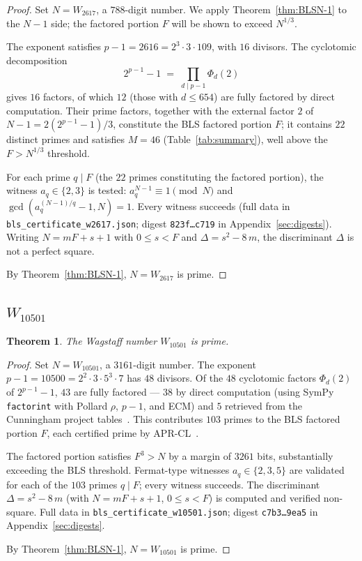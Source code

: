 \documentclass[11pt,a4paper]{amsart}
\theoremstyle{plain}
\newtheorem{theorem}{Theorem}[section]
\theoremstyle{definition}
\begin{document}
\begin{proof}
Set $N = W_{2617}$, a $788$-digit number. We apply
Theorem~\ref{thm:BLSN-1} to the $N - 1$ side; the factored portion
$F$ will be shown to exceed $N^{1/3}$.

The exponent satisfies $p - 1 = 2616 = 2^3 \cdot 3 \cdot 109$, with
$16$ divisors. The cyclotomic decomposition
\[
  2^{p-1} - 1 \;=\; \prod_{d \mid p-1} \Phi_d(2)
\]
gives $16$ factors, of which $12$ (those with $d \leq 654$) are fully
factored by direct computation. Their prime factors, together with the
external factor $2$ of $N - 1 = 2(2^{p-1} - 1)/3$, constitute the BLS
factored portion $F$; it contains $22$ distinct primes and satisfies
$M = 46$ (Table~\ref{tab:summary}), well above the $F > N^{1/3}$
threshold.

For each prime $q \mid F$ (the $22$ primes constituting the factored
portion), the witness $a_q \in \{2, 3\}$ is tested:
$a_q^{N-1} \equiv 1 \pmod N$ and $\gcd(a_q^{(N-1)/q} - 1, N) = 1$.
Every witness succeeds (full data in
\texttt{bls\_certificate\_w2617.json}; digest
\texttt{823f\ldots c719} in
Appendix~\ref{sec:digests}). Writing $N = m F + s + 1$
with $0 \leq s < F$ and $\Delta = s^2 - 8\, m$, the discriminant
$\Delta$ is not a perfect square.

By Theorem~\ref{thm:BLSN-1}, $N = W_{2617}$ is prime.
\end{proof}

\subsection{$W_{10501}$}
\label{ssec:w10501}

\begin{theorem}
\label{thm:w10501}
The Wagstaff number $W_{10501}$ is prime.
\end{theorem}

\begin{proof}
Set $N = W_{10501}$, a $3161$-digit number. The exponent $p - 1 =
10500 = 2^2 \cdot 3 \cdot 5^3 \cdot 7$ has $48$ divisors. Of the $48$
cyclotomic factors $\Phi_d(2)$ of $2^{p-1} - 1$, $43$ are fully
factored --- $38$ by direct computation (using SymPy
\texttt{factorint} with Pollard $\rho$, $p - 1$, and ECM) and $5$
retrieved from the Cunningham project tables~\cite{Cunningham}. This
contributes $103$ primes to the BLS factored portion $F$, each
certified prime by APR-CL~\cite{APR,CohenLenstraAlgo}.

The factored portion satisfies $F^3 > N$ by a margin of $3261$
bits, substantially exceeding the BLS threshold. Fermat-type
witnesses $a_q \in \{2, 3, 5\}$ are validated for each of the $103$
primes $q \mid F$; every witness succeeds. The discriminant
$\Delta = s^2 - 8\, m$ (with $N = m F + s + 1$, $0 \leq s < F$) is
computed and verified non-square. Full data in
\texttt{bls\_certificate\_w10501.json}; digest \texttt{c7b3\ldots 9ea5}
in Appendix~\ref{sec:digests}.

By Theorem~\ref{thm:BLSN-1}, $N = W_{10501}$ is prime.
\end{proof}
\end{document}
